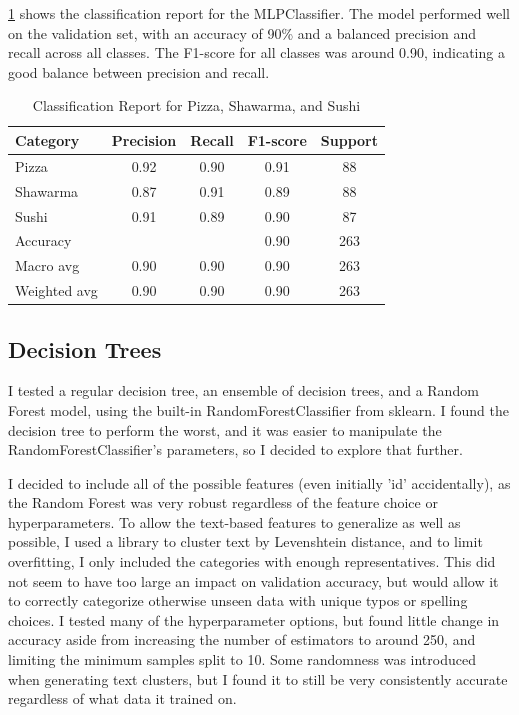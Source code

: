 \ref{tab:nn_classification_report} shows the classification report for the MLPClassifier.
The model performed well on the validation set, with an accuracy of 90\% and a balanced precision and recall across all classes.
The F1-score for all classes was around 0.90, indicating a good balance between precision and recall.

\begin{table}[ht]
    \centering
    \begin{tabular}{lcccc}
        \hline
        Category     & Precision & Recall & F1-score & Support \\
        \hline
        Pizza        & 0.92      & 0.90   & 0.91     & 88      \\
        Shawarma     & 0.87      & 0.91   & 0.89     & 88      \\
        Sushi        & 0.91      & 0.89   & 0.90     & 87      \\
        \hline
        Accuracy     &           &        & 0.90     & 263     \\
        Macro avg    & 0.90      & 0.90   & 0.90     & 263     \\
        Weighted avg & 0.90      & 0.90   & 0.90     & 263     \\
        \hline
    \end{tabular}
    \caption{Classification Report for Pizza, Shawarma, and Sushi}
    \label{tab:nn_classification_report}
\end{table}


\subsection{Decision Trees}
I tested a regular decision tree, an ensemble of decision trees, and a Random Forest model, using the built-in RandomForestClassifier from sklearn. I found the decision tree to perform the worst, and it was easier to manipulate the RandomForestClassifier’s parameters, so I decided to explore that further.

I decided to include all of the possible features (even initially 'id' accidentally), as the Random Forest was very robust regardless of the feature choice or hyperparameters. To allow the text-based features to generalize as well as possible, I used a library to cluster text by Levenshtein distance, and to limit overfitting, I only included the categories with enough representatives. This did not seem to have too large an impact on validation accuracy, but would allow it to correctly categorize otherwise unseen data with unique typos or spelling choices.
I tested many of the hyperparameter options, but found little change in accuracy aside from increasing the number of estimators to around 250, and limiting the minimum samples split to 10. Some randomness was introduced when generating text clusters, but I found it to still be very consistently accurate regardless of what data it trained on.

